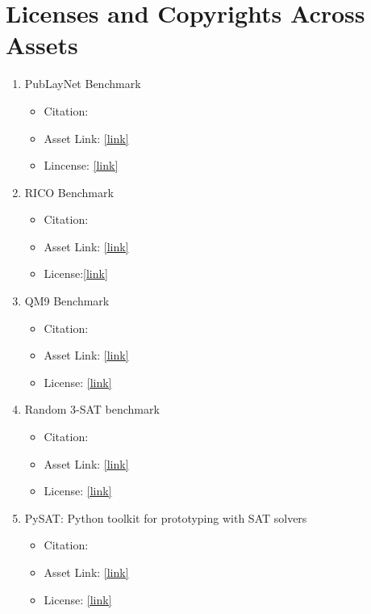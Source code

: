 \newpage
\section{Licenses and Copyrights Across Assets}
\label{app:licenses}

\begin{enumerate}
    \item PubLayNet Benchmark
    \begin{itemize}
        \item Citation:~\cite{zhong2019publaynet}
        \item Asset Link: \href{https://github.com/ibm-aur-nlp/PubLayNet}{[link]}
        \item Lincense: \href{https://github.com/ibm-aur-nlp/PubLayNet/blob/master/LICENSE.md}{[link]}
    \end{itemize}
    \item RICO Benchmark 
    \begin{itemize}
        \item Citation: ~\cite{deka2017rico}
        \item Asset Link: \href{http://www.interactionmining.org/rico.html}{[link]}
        \item License:\href{http://www.interactionmining.org/rico_copyright.txt}{[link]}
    \end{itemize}
    \item QM9 Benchmark
    \begin{itemize} 
        \item Citation: ~\cite{ramakrishnan2014quantum}
        \item Asset Link: \href{http://quantum-machine.org/datasets/}{[link]}
        \item License: \href{https://creativecommons.org/licenses/by/4.0/}{[link]}
    \end{itemize}
    \item Random 3-SAT benchmark
    \begin{itemize}
        \item Citation: ~\cite{ye2024autoregressiondiscretediffusioncomplex}
        \item Asset Link:
        \href{https://github.com/HKUNLP/diffusion-vs-ar?tab=readme-ov-file#usage}{[link]}
        \item License:
        \href{https://github.com/HKUNLP/diffusion-vs-ar/blob/main/LICENSE}{[link]}
    \end{itemize}
    \item PySAT: Python toolkit for prototyping with SAT solvers
    \begin{itemize}
        \item Citation: ~\cite{imms-sat18}
        \item Asset Link: \href{https://github.com/pysathq/pysat}{[link]}
        \item License: \href{https://github.com/pysathq/pysat/blob/master/LICENSE.txt}{[link]}
    \end{itemize}
\end{enumerate}

